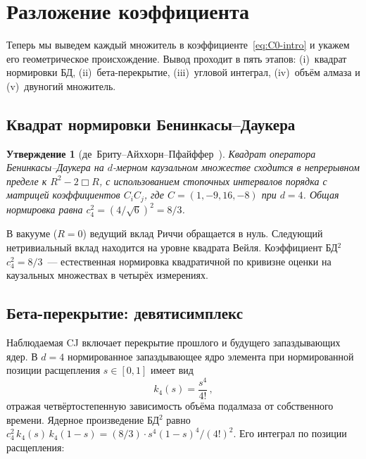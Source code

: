 \documentclass[12pt,a4paper]{article}
\theoremstyle{plain}
\newtheorem{proposition}[theorem]{Утверждение}
\theoremstyle{definition}
\theoremstyle{remark}
\begin{document}
\section{Разложение коэффициента}
\label{sec:derivation}

Теперь мы выведем каждый множитель в
коэффициенте~\eqref{eq:C0-intro} и укажем его
геометрическое происхождение.  Вывод проходит в пять
этапов: (i)~квадрат нормировки БД, (ii)~бета-перекрытие,
(iii)~угловой интеграл, (iv)~объём алмаза и
(v)~двуногий множитель.

\subsection{Квадрат нормировки Бенинкасы--Даукера}
\label{sec:bd2}

\begin{proposition}[де~Бриту--Айххорн--Пфайффер~\cite{deBrito:2023}]
\label{prop:bd2}
Квадрат оператора Бенинкасы--Даукера на $d$-мерном
каузальном множестве сходится в непрерывном пределе к
$R^2 - 2\Box R$, с использованием стопочных интервалов
порядка с матрицей коэффициентов $C_i C_j$, где
$C = (1, -9, 16, -8)$ при $d = 4$.  Общая нормировка
равна $c_4^2 = (4/\sqrt{6})^2 = 8/3$.
\end{proposition}

В вакууме ($R = 0$) ведущий вклад Риччи обращается в нуль.
Следующий нетривиальный вклад находится на уровне квадрата
Вейля.  Коэффициент БД${}^2$ $c_4^2 = 8/3$~--- естественная
нормировка квадратичной по кривизне оценки на каузальных
множествах в четырёх измерениях.

\subsection{Бета-перекрытие: девятисимплекс}
\label{sec:beta}

Наблюдаемая CJ включает перекрытие прошлого и будущего
запаздывающих ядер.  В $d = 4$ нормированное запаздывающее
ядро элемента при нормированной позиции расщепления
$s \in [0,1]$ имеет вид
\begin{equation}\label{eq:kernel}
  k_4(s) = \frac{s^4}{4!}\,,
\end{equation}
отражая четвёртостепенную зависимость объёма подалмаза от
собственного времени.  Ядерное произведение БД${}^2$ равно
$c_4^2\, k_4(s)\, k_4(1-s) = (8/3) \cdot s^4(1-s)^4 / (4!)^2$.
Его интеграл по позиции расщепления:
\end{document}
